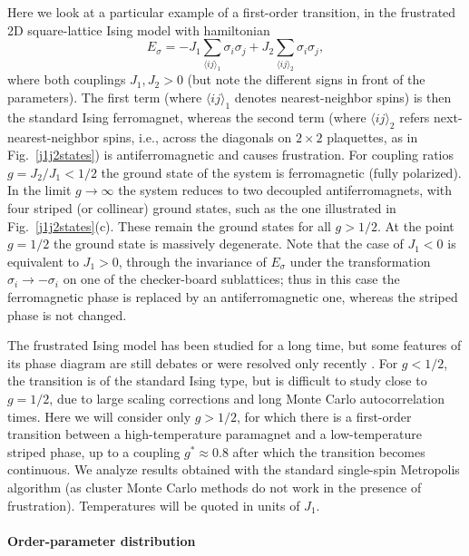 \documentclass[draft,numberedheadings]{aipproc}
\begin{document}
Here we look at a particular example of a first-order transition, in the frustrated 2D square-lattice Ising model with hamiltonian
\begin{equation}
E_\sigma = -J_1\sum_{{\langle ij\rangle}_1} \sigma_i\sigma_j  + J_2\sum_{{\langle ij\rangle}_2} \sigma_i\sigma_j, 
\label{isinghj1j2}
\end{equation}
where both couplings $J_1,J_2>0$ (but note the different signs in front of the parameters). The first term (where ${\langle ij\rangle}_1$ denotes 
nearest-neighbor spins) is then the standard Ising ferromagnet, whereas the second term (where ${\langle ij\rangle}_2$ refers next-nearest-neighbor spins, 
i.e., across the diagonals on $2\times 2$ plaquettes, as in Fig.~\ref{j1j2states}) is antiferromagnetic and causes frustration. For coupling ratios 
$g=J_2/J_1<1/2$ the ground state of the system is ferromagnetic (fully polarized). In the limit $g \to \infty$ the system reduces to two decoupled 
antiferromagnets, with four striped (or collinear) ground states, such as the one illustrated in Fig.~\ref{j1j2states}(c). These remain the ground 
states for all $g>1/2$. At the point $g=1/2$ the ground state is massively degenerate. Note that the case of $J_1<0$ is equivalent to $J_1>0$, through 
the invariance of $E_\sigma$ under the transformation $\sigma_i \to -\sigma_i$ on one of the checker-board sublattices; thus in this case the 
ferromagnetic phase is replaced by an antiferromagnetic one, whereas the striped phase is not changed.

The frustrated Ising model has been studied for a long time, but some features of its phase diagram are still debates or were resolved only 
recently \cite{yin,kalz,jin}. For $g<1/2$, the transition is of the standard Ising type, but is difficult to study close to $g=1/2$, due to 
large scaling corrections and long Monte Carlo autocorrelation times. Here we will consider only $g>1/2$, for which 
there is a first-order transition between a high-temperature paramagnet and a low-temperature striped phase, up to a coupling $g^* \approx 0.8$ \cite{jin} 
after which the transition becomes continuous. We analyze results obtained with the standard single-spin Metropolis algorithm (as cluster Monte Carlo 
methods do not work in the presence of frustration). Temperatures will be quoted in units of $J_1$.

\paragraph{Order-parameter distribution}
\end{document}
